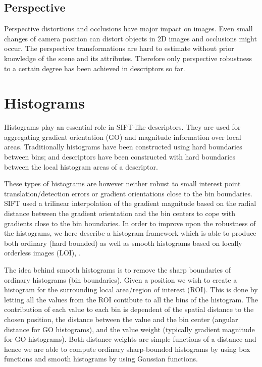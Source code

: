 \documentclass[thesis.tex]{subfiles}
\begin{document}
\subsection{Perspective}
Perspective distortions and occlusions have major impact on images. Even small changes of camera position can distort objects in 2D images and occlusions might occur. The perspective transformations are hard to estimate without prior knowledge of the scene and its attributes. Therefore only perspective robustness to a certain degree has been achieved in descriptors so far.


\section{Histograms}
\label{sec:histograms}

Histograms play an essential role in SIFT-like descriptors. They are used for aggregating gradient orientation (GO) and magnitude information over local areas. Traditionally histograms have been constructed using hard boundaries between bins; and descriptors have been constructed with hard boundaries between the local histogram areas of a descriptor.

These types of histograms are however neither robust to small interest point translation/detection errors or gradient orientations close to the bin boundaries. SIFT used a trilinear interpolation of the gradient magnitude based on the radial distance between the gradient orientation and the bin centers to cope with gradients close to the bin boundaries. In order to improve upon the robustness of the histograms, we here describe a histogram framework which is able to produce both ordinary (hard bounded) as well as smooth histograms based on locally orderless images (LOI), \cite{koenderink1999structure}.

The idea behind smooth histograms is to remove the sharp boundaries of ordinary histograms (bin boundaries). Given a position we wish to create a histogram for the surrounding local area/region of interest (ROI). This is done by letting all the values from the ROI contibute to all the bins of the histogram. The contribution of each value to each bin is dependent of the spatial distance to the chosen position, the distance between the value and the bin center (angular distance for GO histograms), and the value weight (typically gradient magnitude for GO histograms). Both distance weights are simple functions of a distance and hence we are able to compute ordinary sharp-bounded histograms by using box functions and smooth histograms by using Gaussian functions.
\end{document}
